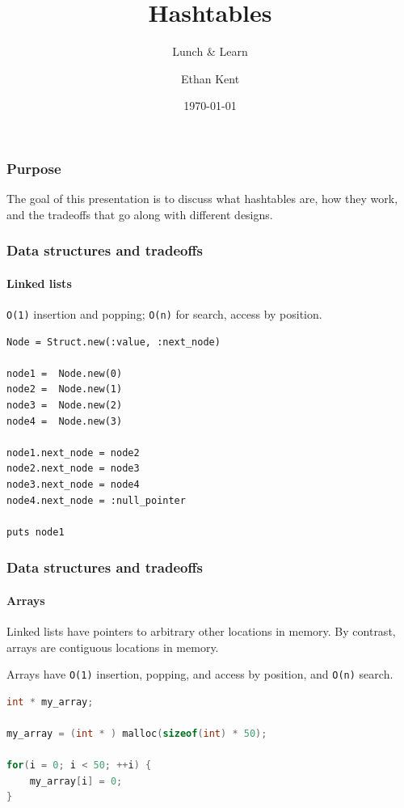 \documentclass{beamer}
\title{Hashtables}
\subtitle{Lunch \& Learn}
\author{Ethan Kent}
\date{\today}
\begin{document}
\frame{\titlepage}

\begin{frame}
    \frametitle{Purpose}

    The goal of this presentation is to discuss what hashtables are, how they
    work, and the tradeoffs that go along with different designs.
\end{frame}

\begin{frame}[fragile]
    \frametitle{Data structures and tradeoffs}
    \framesubtitle{Linked lists}

    \texttt{O(1)} insertion and popping; \texttt{O(n)} for search, access by
    position.

    \begin{lstlisting}
Node = Struct.new(:value, :next_node)

node1 =  Node.new(0)
node2 =  Node.new(1)
node3 =  Node.new(2)
node4 =  Node.new(3)

node1.next_node = node2
node2.next_node = node3
node3.next_node = node4
node4.next_node = :null_pointer

puts node1
    \end{lstlisting}
\end{frame}

\begin{frame}[fragile]
    \frametitle{Data structures and tradeoffs}
    \framesubtitle{Arrays}

    Linked lists have pointers to arbitrary other locations in memory. By
    contrast, arrays are contiguous locations in memory.

    \vspace{1em}

    Arrays have \texttt{O(1)} insertion, popping, and access by position, and
    \texttt{O(n)} search.

    \begin{lstlisting}[language=C]
int * my_array;

my_array = (int * ) malloc(sizeof(int) * 50);

for(i = 0; i < 50; ++i) {
    my_array[i] = 0;
}
    \end{lstlisting}

\end{frame}
\end{document}

